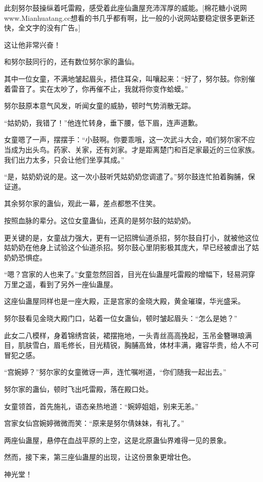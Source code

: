 \begin{this_body}
此刻努尔鼓操纵着吒雷殿，感受着此座仙蛊屋充沛浑厚的威能。[棉花糖小说网www.Mianhuatang.cc想看的书几乎都有啊，比一般的小说网站要稳定很多更新还快，全文字的没有广告。]

这让他非常兴奋！

和努尔鼓同行的，还有数位努尔家的蛊仙。

其中一位女童，不满地皱起眉头，捂住耳朵，叫嚷起来：“好了，努尔鼓。你别催着雷音了。实在太吵了，你再催不止，我就将你变作蛤蟆。”

努尔鼓原本意气风发，听闻女童的威胁，顿时气势消散无踪。

“姑奶奶，我错了！”他连忙转身，垂下腰，低下眉，连声道歉。

女童嗯了一声，摆摆手：“小鼓啊。你要乖哦，这一次武斗大会，咱们努尔家不应当成为出头鸟。药家、关家，还有刘家。才是距离楚门和百足家最近的三位家族。我们出力太多，只会让他们坐享其成。”

“是，姑奶奶说的是。这一次小鼓听凭姑奶奶您调遣了。”努尔鼓连忙拍着胸脯，保证道。

其余努尔家的蛊仙，观此一幕，差点都憋不住笑。

按照血脉的辈分。这位女童蛊仙，还真的是努尔鼓的姑奶奶。

更关键的是，女童战力强大，更有一记招牌仙道杀招，努尔鼓自打小，就被他这位姑奶奶在他身上试验这个仙道杀招。努尔鼓心里阴影极其庞大，早已经被虐出了姑奶奶恐惧症。

“嗯？宫家的人也来了。”女童忽然回首，目光在仙蛊屋吒雷殿的增幅下，轻易洞穿万里之遥，看到了另外一座仙蛊屋。

这座仙蛊屋同样也是一座大殿，正是宫家的金晓大殿，黄金璀璨，华光盛采。

努尔鼓看见金晓大殿门口，站着一位女蛊仙，顿时皱起眉头：“怎么是她？”

此女二八模样，身着锦绣宫装，裙摆拖地，一头青丝高高挽起，玉吊金簪琳琅满目，肌肤雪白，眉毛修长，目光精锐，胸脯高耸，体材丰满，雍容华贵，给人不可冒犯之感。

“宫婉婷？”努尔家的女童微讶一声，连忙嘱咐道，“你们随我一起出去。”

努尔家的蛊仙，顿时飞出吒雷殿，落在殿口处。

女童领首，首先施礼，语态亲热地道：“婉婷姐姐，别来无恙。”

宫家女仙宫婉婷微微而笑：“原来是努尔倩妹妹，有礼了。”

两座仙蛊屋，悬停在血战平原的上空，这是北原蛊仙界难得一见的景象。

然而，接下来，第三座仙蛊屋的出现，让这份景象更增壮色。

神光堂！


\end{this_body}
